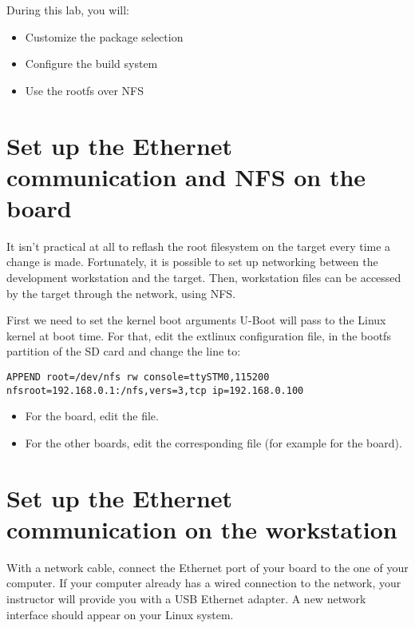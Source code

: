 
During this lab, you will:
\begin{itemize}
  \item Customize the package selection
  \item Configure the build system
  \item Use the rootfs over NFS
\end{itemize}

\section{Set up the Ethernet communication and NFS on the board}

It isn't practical at all to reflash the root filesystem on the target
every time a change is made. Fortunately, it is possible to set up
networking between the development workstation and the target. Then,
workstation files can be accessed by the target through the network,
using NFS.

First we need to set the kernel boot arguments U-Boot will pass to the
Linux kernel at boot time. For that, edit the extlinux configuration file, in
the bootfs partition of the SD card and change the  line to:

{\small
\begin{verbatim}
APPEND root=/dev/nfs rw console=ttySTM0,115200 nfsroot=192.168.0.1:/nfs,vers=3,tcp ip=192.168.0.100
\end{verbatim}
}

\begin{itemize}
  \item For the  board, edit the  file.
  \item For the other boards, edit the corresponding file (for example 
        for the  board).
\end{itemize}

\section{Set up the Ethernet communication on the workstation}

With a network cable, connect the Ethernet port of your board to the
one of your computer. If your computer already has a wired connection
to the network, your instructor will provide you with a USB Ethernet
adapter. A new network interface should appear on your Linux system.

